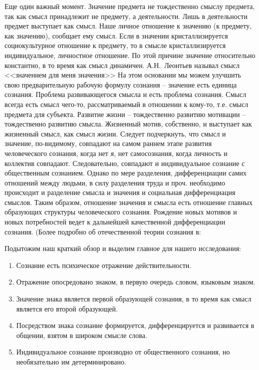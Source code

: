 Еще один важный момент. Значение предмета не тождественно смыслу предмета,
так как смысл принадлежит не предмету, а деятельности.\autocite{leontev2005lectures}
Лишь в деятельности предмет выступает как смысл.
Наше личное отношение к значению (к предмету, как значению), сообщает ему смысл.
Если в значении кристаллизируется социокультурное отношение к предмету,
то в смысле кристаллизируется индивидуальное, личностное отношение.
По этой причине значение относительно константно, в то время как смысл динамичен.
А.Н.~Леонтьев называл смысл <<значением для меня значения>>\autocite{leontev2005lectures}
На этом основании мы можем улучшить свою предварительную рабочую формулу сознания --
значение есть единица сознания. Проблема развивающегося смысла и есть проблема
сознания. Смысл всегда есть смысл чего-то, рассматриваемый в отношении к кому-то,
т.е. смысл предмета для субъекта. Развитие жизни -- тождественно развитию мотивации --
тождественно развитию смысла. Жизненный мотив, собственно, и выступает как жизненный
смысл, как смысл жизни. Следует подчеркнуть, что смысл и значение, по-видимому,
совпадают на самом раннем этапе развития человеческого сознания, когда нет \emph{я},
нет самосознания, когда личность и коллектив совпадают. Следовательно, совпадают и
индивидуальное сознание с общественным сознанием. Однако по мере разделения,
дифференциации самих отношений между людьми, в силу разделения труда и проч.
необходимо происходит и разделение смысла и значения и социальная дифференциация
смыслов. Таким образом, отношение значения и смысла есть отношение главных
образующих структуры человеческого сознания. Рождение новых мотивов и новых
потребностей ведет к дальнейшей качественной дифференциации сознания.
(Более подробно об отечественной теории сознания в: \autocite{leontevan1967}\autocite{leontevan1975}\autocite{leontevan1983}\autocite{vigotski1982}\autocite{leontevaa2001}

Подытожим наш краткий обзор и выделим главное для нашего исследования:
\begin{enumerate}
\item Сознание есть психическое отражение действительности.
\item Отражение опосредовано знаком, в первую очередь словом, языковым знаком.
\item Значение знака является первой образующей сознания, в то время как смысл
  является его второй образующей.
\item Посредством знака сознание формируется, дифференцируется и развивается
  в общении, взятом в широком смысле слова.
\item Индивидуальное сознание производно от общественного сознания,
  но необязательно им детерминировано.
\end{enumerate}

